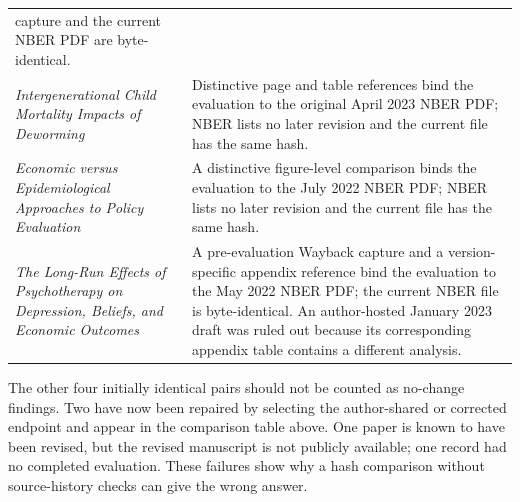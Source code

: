 \documentclass[
  11pt,
  letterpaper,
]{article}
\begin{document}
\begin{longtable}[]{@{}
  >{\raggedright\arraybackslash}p{}
  >{\raggedright\arraybackslash}p{}@{}}
capture and the current NBER PDF are byte-identical. \\
\emph{Intergenerational Child Mortality Impacts of Deworming} &
Distinctive page and table references bind the evaluation to the
original April 2023 NBER PDF; NBER lists no later revision and the
current file has the same hash. \\
\emph{Economic versus Epidemiological Approaches to Policy Evaluation} &
A distinctive figure-level comparison binds the evaluation to the July
2022 NBER PDF; NBER lists no later revision and the current file has the
same hash. \\
\emph{The Long-Run Effects of Psychotherapy on Depression, Beliefs, and
Economic Outcomes} & A pre-evaluation Wayback capture and a
version-specific appendix reference bind the evaluation to the May 2022
NBER PDF; the current NBER file is byte-identical. An author-hosted
January 2023 draft was ruled out because its corresponding appendix
table contains a different analysis. \\
\end{longtable}

The other four initially identical pairs should not be counted as
no-change findings. Two have now been repaired by selecting the
author-shared or corrected endpoint and appear in the comparison table
above. One paper is known to have been revised, but the revised
manuscript is not publicly available; one record had no completed
evaluation. These failures show why a hash comparison without
source-history checks can give the wrong answer.
\end{document}
